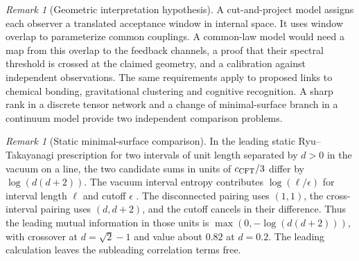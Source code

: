 \documentclass[aps,pra,onecolumn,superscriptaddress,nofootinbib,10pt]{revtex4-2}
\theoremstyle{definition}
\theoremstyle{remark}
\newtheorem{remark}[theorem]{Remark}
\begin{document}
\begin{remark}[Geometric interpretation hypothesis]\label{ob:observergeometry}
A cut-and-project model assigns each observer a translated acceptance
window in internal space. It uses window overlap to parameterize common
couplings. A common-law model would need a map from this overlap to
the feedback channels, a proof that their spectral threshold is
crossed at the claimed geometry, and a calibration against independent
observations. The same requirements apply to proposed links to
chemical bonding, gravitational clustering and cognitive recognition.
A sharp rank in a discrete tensor network and a change of
minimal-surface branch in a continuum model provide two independent
comparison problems.
\end{remark}

\begin{remark}[Static minimal-surface comparison]\label{ob:rt}
In the leading static Ryu--Takayanagi prescription for two intervals
of unit length separated by $d>0$ in the vacuum on a line, the
two candidate sums in units of $c_{\rm CFT}/3$ differ by
$\log(d(d+2))$. The vacuum interval entropy contributes
$\log(\ell/\epsilon)$ for interval length $\ell$ and cutoff
$\epsilon$ \cite{n1-rt,obr:headrick}. The disconnected pairing uses
$(1,1)$, the cross-interval pairing uses $(d,d+2)$, and the cutoff
cancels in their difference. Thus the leading mutual information
in those units is $\max(0,-\log(d(d+2)))$, with crossover at
$d=\sqrt2-1$ and value about $0.82$ at $d=0.2$.
The leading calculation leaves the subleading correlation terms free.
\end{remark}
\end{document}

